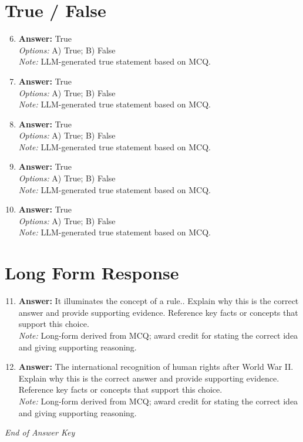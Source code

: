 \documentclass[12pt]{article}
\begin{document}
\section*{True / False}
\begin{enumerate}[label=\arabic*.]
\setcounter{enumi}{5}
\item \textbf{Answer:} True
\\ \textit{Options:} A) True; B) False
\\ \textit{Note:} LLM-generated true statement based on MCQ.
\item \textbf{Answer:} True
\\ \textit{Options:} A) True; B) False
\\ \textit{Note:} LLM-generated true statement based on MCQ.
\item \textbf{Answer:} True
\\ \textit{Options:} A) True; B) False
\\ \textit{Note:} LLM-generated true statement based on MCQ.
\item \textbf{Answer:} True
\\ \textit{Options:} A) True; B) False
\\ \textit{Note:} LLM-generated true statement based on MCQ.
\item \textbf{Answer:} True
\\ \textit{Options:} A) True; B) False
\\ \textit{Note:} LLM-generated true statement based on MCQ.
\end{enumerate}

\section*{Long Form Response}
\begin{enumerate}[label=\arabic*.]
\setcounter{enumi}{10}
\item \textbf{Answer:} It illuminates the concept of a rule.. Explain why this is the correct answer and provide supporting evidence. Reference key facts or concepts that support this choice.
\\ \textit{Note:} Long-form derived from MCQ; award credit for stating the correct idea and giving supporting reasoning.
\item \textbf{Answer:} The international recognition of human rights after World War II. Explain why this is the correct answer and provide supporting evidence. Reference key facts or concepts that support this choice.
\\ \textit{Note:} Long-form derived from MCQ; award credit for stating the correct idea and giving supporting reasoning.
\end{enumerate}

\vfill
\noindent\textit{End of Answer Key}
\end{document}
